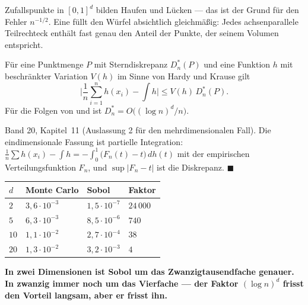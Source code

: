 \begin{merksatz}
Zufallspunkte in $[0,1]^d$ bilden Haufen und Lücken --- das ist der Grund für den Fehler $n^{-1/2}$. Eine  füllt den Würfel absichtlich gleichmäßig: Jedes achsenparallele Teilrechteck enthält fast genau den Anteil der Punkte, der seinem Volumen entspricht.

Für eine Punktmenge $P$ mit Sterndiskrepanz $D^*_n(P)$ und eine Funktion $h$ mit beschränkter Variation $V(h)$ im Sinne von Hardy und Krause gilt
\[ \Big|\frac1n\sum_{i=1}^n h(x_i) - \int h\Big| \le V(h)\,D^*_n(P) . \]
Für die Folgen von  und  ist $D^*_n = O\big((\log n)^d/n\big)$.

Band 20, Kapitel~11 (Auslassung 2 für den mehrdimensionalen Fall). Die eindimensionale Fassung ist partielle Integration: $\frac1n\sum h(x_i) - \int h = -\int_0^1 \big(F_n(t) - t\big)\,dh(t)$ mit der empirischen Verteilungsfunktion $F_n$, und $\sup|F_n - t|$ ist die Diskrepanz. $\blacksquare$

\begin{center}
{\small
\renewcommand{\arraystretch}{1.48}
\begin{tabular}{@{}P{1.2cm}P{2.4cm}P{2.6cm}P{2.0cm}@{}}
\toprule
$d$ & \textbf{Monte Carlo} & \textbf{Sobol} & \textbf{Faktor}\\
\midrule
$2$ & $3{,}6\cdot10^{-3}$ & $1{,}5\cdot10^{-7}$ & $24\,000$\\
$5$ & $6{,}3\cdot10^{-3}$ & $8{,}5\cdot10^{-6}$ & $740$\\
$10$ & $1{,}1\cdot10^{-2}$ & $2{,}7\cdot10^{-4}$ & $38$\\
$20$ & $1{,}3\cdot10^{-2}$ & $3{,}2\cdot10^{-3}$ & $4$\\
\bottomrule
\end{tabular}}
\end{center}

\begin{center}
\begin{minipage}{0.9\textwidth}
\textbf{In zwei Dimensionen ist Sobol um das Zwanzigtausendfache genauer. In zwanzig immer noch um das Vierfache --- der Faktor $(\log n)^d$ frisst den Vorteil langsam, aber er frisst ihn.}
\end{minipage}
\end{center}


\end{merksatz}
